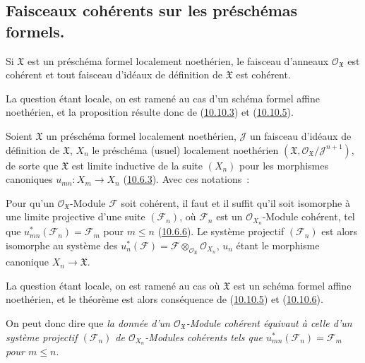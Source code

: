 
\subsection{Faisceaux cohérents sur les préschémas formels.}
\label{subsection:I.10.11-fr}

\begin{proposition}[10.11.1]
\label{I.10.11.1-fr}
Si $\mathfrak{X}$ est un préschéma formel localement noethérien, le
faisceau d'anneaux $\mathscr{O}_{\mathfrak{X}}$ est cohérent et tout
faisceau d'idéaux de définition de $\mathfrak{X}$ est cohérent.
\end{proposition}

La question étant locale, on est ramené au cas d'un schéma formel affine
noethérien, et la proposition résulte donc de
(\hyperref[I.10.10.3-fr]{10.10.3}) et
(\hyperref[I.10.10.5-fr]{10.10.5}).

\begin{env}[10.11.2]
\label{I.10.11.2-fr}
Soient $\mathfrak{X}$ un préschéma formel localement noethérien,
$\mathscr{J}$ un faisceau d'idéaux de définition de $\mathfrak{X}$,
$X_n$ le préschéma (usuel) localement noethérien
$(\mathfrak{X},\mathscr{O}_{\mathfrak{X}}/\mathscr{J}^{n+1})$, de
sorte que $\mathfrak{X}$ est limite inductive de la suite $(X_n)$ pour
les morphismes canoniques $u_{mn}:X_m\to X_n$
(\hyperref[I.10.6.3-fr]{10.6.3}). Avec ces notations~:
\end{env}

\begin{theorem}[10.11.3]
\label{I.10.11.3-fr}
Pour qu'un $\mathscr{O}_{\mathfrak{X}}$-Module $\mathscr{F}$ soit
cohérent, il faut et il suffit qu'il soit isomorphe à une limite
projective d'une suite $(\mathscr{F}_n)$, où $\mathscr{F}_n$ est un
$\mathscr{O}_{X_n}$-Module cohérent, tel que
$u_{mn}^*(\mathscr{F}_n)=\mathscr{F}_m$ pour $m\leq n$
(\hyperref[I.10.6.6-fr]{10.6.6}). Le système projectif
$(\mathscr{F}_n)$ est alors isomorphe au système des
$u_n^*(\mathscr{F})=\mathscr{F}
\otimes_{\mathscr{O}_{\mathfrak{X}}}\mathscr{O}_{X_n}$, $u_n$ étant
le morphisme canonique $X_n\to\mathfrak{X}$.
\end{theorem}

La question étant locale, on est ramené au cas où $\mathfrak{X}$ est
un schéma formel affine noethérien, et le théorème est alors conséquence
de (\hyperref[I.10.10.5-fr]{10.10.5}) et
(\hyperref[I.10.10.6-fr]{10.10.6}).

On peut donc dire que \emph{la donnée d'un
$\mathscr{O}_{\mathfrak{X}}$-Module cohérent équivaut à celle d'un
système projectif $(\mathscr{F}_n)$ de
$\mathscr{O}_{X_n}$-Modules cohérents tels que
$u_{mn}^*(\mathscr{F}_n)=\mathscr{F}_m$ pour $m\leq n$}.

